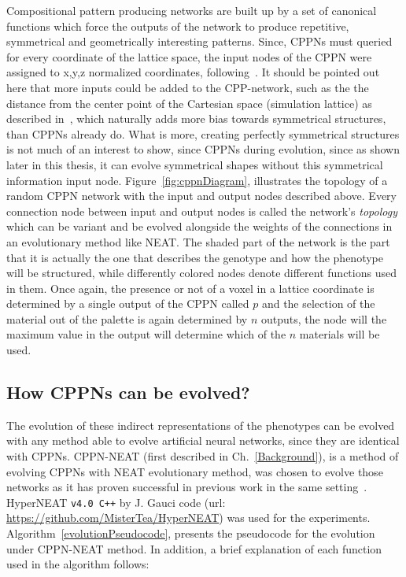 Compositional pattern producing networks are built up by a set of canonical functions which force the outputs of the network to produce repetitive, symmetrical and geometrically interesting patterns. Since, CPPNs must queried for every coordinate of the lattice space, the input nodes of the CPPN were assigned to x,y,z normalized coordinates, following~\cite{cheney2013unshackling}. It should be pointed out here that more inputs could be added to the CPP-network, such as the the distance from the center point of the Cartesian space (simulation lattice) as described in~\cite{stanley2007compositional}, which naturally adds more bias towards symmetrical structures, than CPPNs already do. What is more, creating perfectly symmetrical structures is not much of an interest to show, since CPPNs during evolution, since as shown later in this thesis, it can evolve symmetrical shapes without this symmetrical information input node. Figure~\ref{fig:cppnDiagram}, illustrates the topology of a random CPPN network with the input and output nodes described above. Every connection node between input and output nodes is called the network's \emph{topology} which can be variant and be evolved alongside the weights of the connections in an evolutionary method like NEAT. The shaded part of the network is the part that it is actually the one that describes the genotype and how the phenotype will be structured, while differently colored nodes denote different functions used in them.
Once again, the presence or not of a voxel in a lattice coordinate is determined by a single output of the CPPN called $p$ and the selection of the material out of the palette is again determined by $n$ outputs, the node will the maximum value in the output will determine which of the $n$ materials will be used.


\subsection{How CPPNs can be evolved?}
The evolution of these indirect representations of the phenotypes can be evolved with any method able to evolve artificial neural networks, since they are identical with CPPNs. CPPN-NEAT (first described in Ch.~\ref{Background}), is a method of evolving CPPNs with NEAT evolutionary method, was chosen to evolve those networks as it has proven successful in previous work in the same setting~\cite{cheney2013unshackling}. HyperNEAT \texttt{v4.0 C++} by J. Gauci code (url: \url{https://github.com/MisterTea/HyperNEAT}) was used for the experiments. Algorithm~\ref{evolutionPseudocode}, presents the pseudocode for the evolution under CPPN-NEAT method. In addition, a brief explanation of each function used in the algorithm follows:


